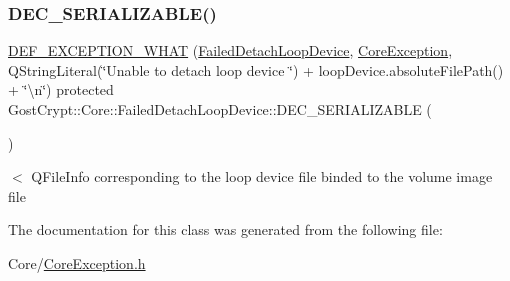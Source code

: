 \subsubsection{\texorpdfstring{D\+E\+C\+\_\+\+S\+E\+R\+I\+A\+L\+I\+Z\+A\+B\+L\+E()}{DEC\_SERIALIZABLE()}}
{\footnotesize\ttfamily \hyperlink{_gost_crypt_exception_8h_a5bc1e1c6c9d6f46c84eeba49e33355f9}{D\+E\+F\+\_\+\+E\+X\+C\+E\+P\+T\+I\+O\+N\+\_\+\+W\+H\+AT} (\hyperlink{class_gost_crypt_1_1_core_1_1_failed_detach_loop_device}{Failed\+Detach\+Loop\+Device}, \hyperlink{class_gost_crypt_1_1_core_1_1_core_exception}{Core\+Exception}, Q\+String\+Literal(\char`\"{}Unable to detach loop device \char`\"{}) + loop\+Device.\+absolute\+File\+Path() + \char`\"{}\textbackslash{}n\char`\"{}) protected Gost\+Crypt\+::\+Core\+::\+Failed\+Detach\+Loop\+Device\+::\+D\+E\+C\+\_\+\+S\+E\+R\+I\+A\+L\+I\+Z\+A\+B\+LE (\begin{DoxyParamCaption}\item[{\hyperlink{class_gost_crypt_1_1_core_1_1_failed_detach_loop_device}{Failed\+Detach\+Loop\+Device}}]{ }\end{DoxyParamCaption})}

$<$ Q\+File\+Info corresponding to the loop device file binded to the volume image file 

The documentation for this class was generated from the following file\+:\begin{DoxyCompactItemize}
\item 
Core/\hyperlink{_core_exception_8h}{Core\+Exception.\+h}\end{DoxyCompactItemize}
